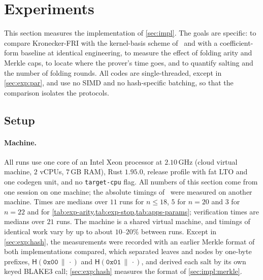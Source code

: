 \section{Experiments}\label{sec:exp}

This section measures the implementation of \cref{sec:impl}.
The goals are specific: to compare Kronecker-FRI with the kernel-basis scheme of~\cite{Mkh26} and with a coefficient-form baseline at identical engineering, to measure the effect of folding arity and Merkle caps, to locate where the prover's time goes, and to quantify salting and the number of folding rounds.
All codes are single-threaded, except in \cref{sec:exp:par}, and use no SIMD and no hash-specific batching, so that the comparison isolates the protocols.

\subsection{Setup}\label{sec:exp:setup}

\paragraph{Machine.}
All runs use one core of an Intel Xeon processor at $2.10$\,GHz (cloud virtual machine, $2$ vCPUs, $7$\,GB RAM), Rust $1.95.0$, release profile with fat LTO and one codegen unit, and no \texttt{target-cpu} flag.
All numbers of this section come from one session on one machine; the absolute timings of~\cite{Mkh26} were measured on another machine.
Times are medians over $11$ runs for $n \le 18$, $5$ for $n = 20$ and $3$ for $n = 22$ and for \cref{tab:exp-arity,tab:exp-stop,tab:apps-params}; verification times are medians over $21$ runs.
The machine is a shared virtual machine, and timings of identical work vary by up to about $10$--$20\%$ between runs.
Except in \cref{sec:exp:hash}, the measurements were recorded with an earlier Merkle format of both implementations compared, which separated leaves and nodes by one-byte prefixes, $\mathsf{H}(\mathtt{0x00}\,\|\,\cdot)$ and $\mathsf{H}(\mathtt{0x01}\,\|\,\cdot)$, and derived each salt by its own keyed BLAKE3 call; \cref{sec:exp:hash} measures the format of \cref{sec:impl:merkle}.

